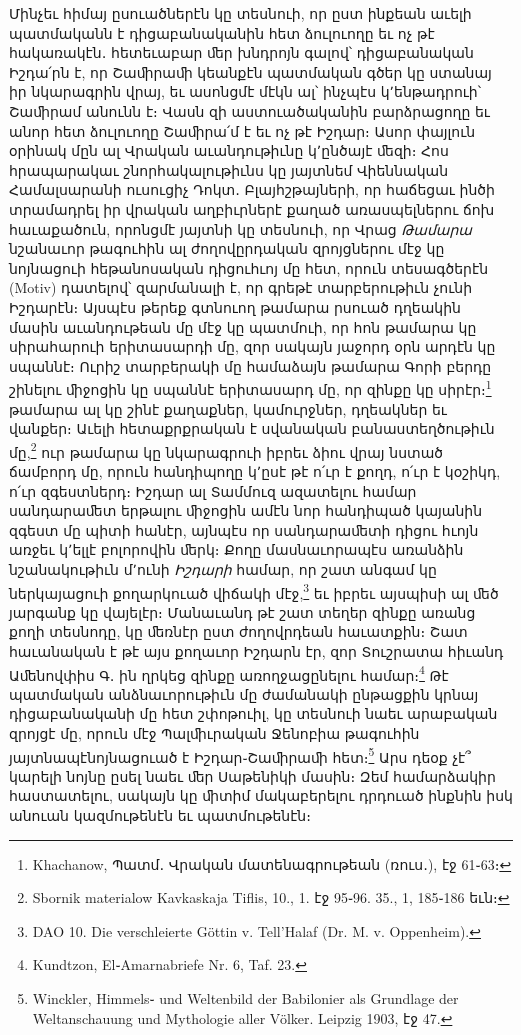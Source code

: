 \documentclass{article}
\begin{document}
{Մինչեւ հիմայ ըսուածներէն կը տեսնուի, որ ըստ ինքեան աւելի պատմականն է դիցաբանականին հետ ձուլուողը եւ ոչ թէ հակառակէն․ հետեւաբար ﬔր խնդրոյն գալով՝ դիցաբանական Իշդա՛րն է, որ Շաﬕրաﬕ կեանքէն պատմական գծեր կը ստանայ իր նկարագրին վրայ, եւ ասոնցմէ մէկն ալ՝ ինչպէս կ՚ենթադրուի՝ Շաﬕրամ անունն է։ Վասն զի աստուածականին բարձրացողը եւ անոր հետ ձուլուողը Շաﬕրա՛մ է եւ ոչ թէ Իշդար։ Ասոր փայլուն օրինակ մըն ալ Վրական աւանդութիւնը կ՚ընծայէ ﬔզի։ Հոս հրապարակաւ շնորհակալութիւնս կը յայտնեմ Վիեննական Համալսարանի ուսուցիչ Դոկտ․ Բլայհշթայների, որ հաճեցաւ ինծի տրամադրել իր վրական աղբիւրներէ քաղած առասպելներու ճոխ հաւաքածուն, որոնցմէ յայտնի կը տեսնուի, որ Վրաց \emph{Թամարա} նշանաւոր թագուհին ալ ժողովըրդական զրոյցներու մէջ կը նոյնացուի հեթանոսական դիցուհւոյ մը հետ, որուն տեսագծերէն (Motiv) դատելով՝ զարմանալի է, որ գրեթէ տարբերութիւն չունի Իշդարէն։ Այսպէս թերեք գտնուող թամարա րսուած դղեակին մասին աւանդութեան մը մէջ կը պատմուի, որ հոն թամարա կը սիրահարուի երիտասարդի մը, զոր սակայն յաջորդ օրն արդէն կը սպաննէ։ Ուրիշ տարբերակի մը համաձայն թամարա Գորի բերդը շինելու ﬕջոցին կը սպաննէ երիտասարդ մը, որ զինքը կը սիրէր։\footnote{Khachanow, Պատմ․ Վրական մատենագրութեան (ռուս․), էջ 61֊63։} թամարա ալ կը շինէ քաղաքներ, կամուրջներ, դղեակներ եւ վանքեր։ Աւելի հետաքրքրական է սվանական բանաստեղծութիւն մը,\footnote{Sbornik materialow Kavkaskaja Tiflis, 10., 1. էջ 95֊96. 35., 1, 185֊186 եւն։} ուր թամարա կը նկարագրուի իբրեւ ձիու վրայ նստած ճամբորդ մը, որուն հանդիպողը կ՚ըսէ թէ ո՛ւր է քողդ, ո՛ւր է կօշիկդ, ո՛ւր զգեստներդ։ Իշդար ալ Տամմուզ ազատելու համար սանդարաﬔտ երթալու ﬕջոցին ամէն նոր հանդիպած կայանին զգեստ մը պիտի հանէր, այնպէս որ սանդարաﬔտի դիցու հւոյն առջեւ կ՚ելլէ բոլորովին ﬔրկ։ Քողը մասնաւորապէս առանձին նշանակութիւն մ՚ունի \emph{Իշդարի} համար, որ շատ անգամ կը ներկայացուի քողարկուած վիճակի մէջ,\footnote{DAO 10. Die verschleierte Göttin v. Tell'Halaf (Dr. M. v. Oppenheim).} եւ իբրեւ այսպիսի ալ ﬔծ յարգանք կը վայելէր։ Մանաւանդ թէ շատ տեղեր զինքը առանց քողի տեսնոդը, կը ﬔռնէր ըստ ժողովրդեան հաւատքին։ Շատ հաւանական է թէ այս քողաւոր Իշդարն էր, զոր Տուշրատա հիւանդ Աﬔնովփիս Գ․ ին ղրկեց զինքը առողջացընելու համար։\footnote{Kundtzon, El֊Amarnabriefe Nr. 6, Taf. 23.} Թէ պատմական անձնաւորութիւն մը ժամանակի ընթացքին կրնայ դիցաբանականի մը հետ շփոթուիլ, կը տեսնուի նաեւ արաբական զրոյցէ մը, որուն մէջ Պալﬕւրական Ջենոբիա թագուհին յայտնապէնոյնացուած է Իշդար֊Շաﬕրաﬕ հետ։\footnote{Winckler, Himmels֊ und Weltenbild der Babilonier als Grundlage der Weltanschauung und Mythologie aller Völker. Leipzig 1903, էջ 47.} Արս դեօք չէ՞ կարելի նոյնը ըսել նաեւ ﬔր Սաթենիկի մասին։ Զեմ համարձակիր հաստատելու, սակայն կը ﬕտիմ մակաբերելու դրդուած ինքնին իսկ անուան կազմութենէն եւ պատմութենէն։

}
\end{document}
